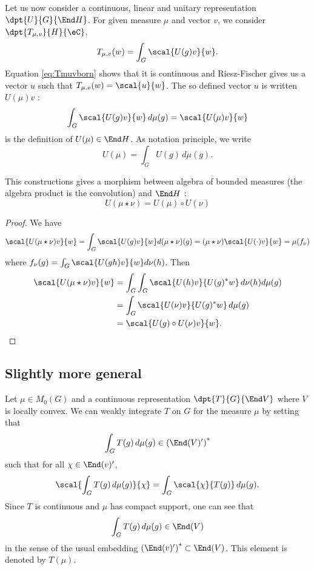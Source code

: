 Let us now consider a continuous, linear and unitary representation $\dpt{U}{G}{\End H}$. For given measure $\mu$ and vector $v$, we consider $\dpt{T_{\mu,v}}{H}{\eC}$,
\[ 
  T_{\mu,v}(w)=\int_G\scal{U(g)v}{w}.
\]
Equation \eqref{eq:Tmuvborn} shows that it is continuous and Riesz-Fischer gives us a vector $u$ such that $T_{\mu,v}(w)=\scal{u}{w}$. The so defined vector $u$ is written $U(\mu)v$ :
\begin{equation}
   \int_G \scal{U(g)v}{w}\,d\mu(g)=\scal{U(\mu)v}{w}
\end{equation}
is the definition of $U(\mu)\in\End H$. As notation principle, we write
\[ 
  U(\mu)=\int_GU(g)\,d\mu(g).
\]

\begin{proposition}

This constructions gives a morphism between algebra of bounded measures (the algebra product is the convolution) and $\End H$ :
\begin{equation}
  U( \mu\star\nu)=U(\mu)\circ U(\nu)
\end{equation}

\end{proposition}


\begin{proof}
We have
\begin{equation}
\scal{U(\mu\star\nu)v}{w}=\int_G \scal{U(g)v}{w}d(\mu\star\nu)(g)
		=(\mu\star\nu)\scal{U(\cdot)v}{w}
		=\mu(f_{\nu})
\end{equation}
where $f_{\nu}(g)=\int_G\scal{U(gh)v}{w}d\nu(h)$. Then
\begin{equation}
\begin{split}
\scal{U(\mu\star\nu)v}{w}&=\int_G\int_G \scal{U(h)v}{U(g)^*w}\,d\nu(h)d\mu(g)\\
		&=\int_G\scal{U(\nu)v}{U(g)^*w}\,d\mu(g)\\
		&=\scal{U(g)\circ U(\nu)v}{w}.
\end{split}
\end{equation}
\end{proof}

\subsection{Slightly more general}

Let $\mu\in M_0(G)$ and a continuous representation $\dpt{T}{G}{\End V}$ where $V$ is locally convex. We can weakly integrate $T$ on $G$ for the measure $\mu$ by setting that 
\[ 
  \int_G T(g)\,d\mu(g)\in\left( \End(V)' \right)^*
\]
such that for all $\chi\in\End(v)'$,
\begin{equation}
\scal{\int_G T(g)\,d\mu(g)}{\chi}=\int_G\scal{\chi}{T(g)}\,d\mu(g).
\end{equation}
Since $T$ is continuous and $\mu$ has compact support, one can see that
\[ 
  \int_GT(g)\,d\mu(g)\in\End(V)
\]
in the sense of the usual embedding $\left( \End(v)' \right)^*\subset\End(V)$. This element is denoted by $T(\mu)$.

